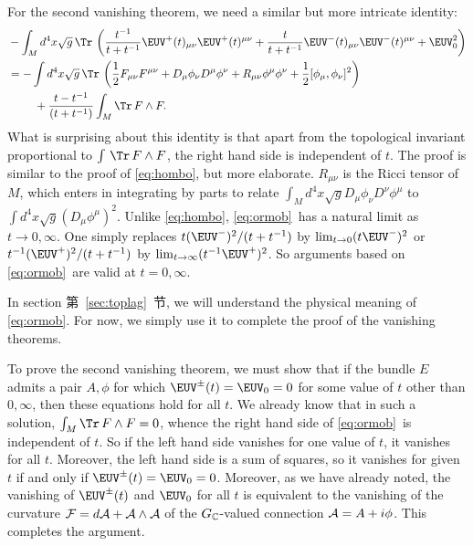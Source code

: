 For the second vanishing theorem, we need a similar but more
intricate identity: %
\setcounter{equation}{32}
\begin{equation}\label{eq:ormob}
\begin{aligned}&-\int_Md^4x\sqrt
g\,\Tr\,\left({t^{-1}\over
t+t^{-1}}\EUV^+(t)_{\mu\nu}\EUV^+(t)^{\mu\nu}+{t\over
t+t^{-1}}\EUV^-(t)_{\mu\nu}\EUV^-(t)^{\mu\nu}+\EUV_0^2\right)\\
&=-\int d^4x\sqrt g\,\Tr\,\left({1\over 2}F_{\mu\nu}
F^{\mu\nu}+D_\mu\phi_\nu D^\mu\phi^\nu
+R_{\mu\nu}\phi^\mu\phi^\nu+ {1\over
2}[\phi_\mu,\phi_\nu]^2\right)\\&~~~~~~~+{t-t^{-1}\over
(t+t^{-1})}\int_M\Tr\, F\wedge F. \\\end{aligned}
\end{equation}
 What is surprising about
this identity is that apart from the topological invariant
proportional to $\int\,\Tr\,F\wedge F$, the right hand side is
independent of $t$.  The proof is similar to the proof of \eqref{eq:hombo},
but more elaborate. $R_{\mu\nu}$ is the Ricci tensor of $M$, which
enters in integrating by parts to relate $\int_Md^4x\sqrt g
D_\mu\phi_\nu D^\nu\phi^\mu$ to $\int d^4x\sqrt g
(D_\mu\phi^\mu)^2$.  Unlike \eqref{eq:hombo}, \eqref{eq:ormob}\ has a natural limit as
$t\to 0,\infty$.  One simply replaces $t (\EUV^-)^2/(t+t^{-1})$ by
$\lim_{t\to 0}(t\EUV^-)^2$ or $t^{-1}(\EUV^+)^2/(t+t^{-1})$ by
$\lim_{t\to \infty}(t^{-1}\EUV^+)^2$.  So arguments based on
\eqref{eq:ormob}\ are valid at $t=0,\infty$.

In section 第~\ref{sec:toplag}~节, we will understand the physical meaning of
\eqref{eq:ormob}. For now, we simply use it to complete the proof of the
vanishing theorems.

To prove the second vanishing theorem, we must show that if the
bundle $E$ admits a pair $A,\phi$ for which $\EUV^\pm(t)=\EUV_0=0$
for some value of $t$ other than $0,\infty$, then these equations
hold for all $t$.  We already know that in such a solution,
$\int_M\Tr\,F\wedge F=0$, whence the right hand side of \eqref{eq:ormob}\ is
independent of $t$.  So if the left hand side vanishes for one
value of $t$, it vanishes for all $t$. Moreover, the left hand
side is a sum of squares, so it vanishes for given $t$ if and only
if $\EUV^\pm(t)=\EUV_0=0$. Moreover, as we have already noted, the
vanishing of $\EUV^\pm(t)$ and $\EUV_0$ for all $t$ is equivalent
to the vanishing of the curvature ${\cal F}=d{\cal A}+{\cal
A}\wedge {\cal A}$ of the $G_{\Bbb{C}}$-valued connection ${\cal
A}=A+i\phi$.  This completes the argument.

